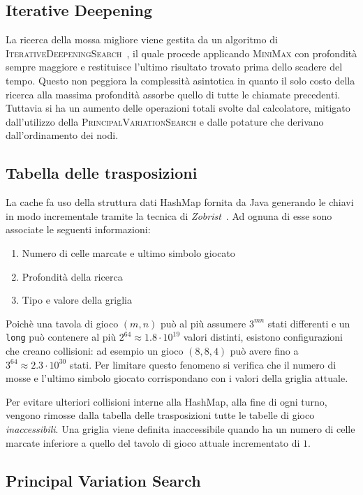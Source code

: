 \documentclass{article}
\begin{document}
\subsection{Iterative Deepening}

La ricerca della mossa migliore viene gestita da un algoritmo di
\textsc{IterativeDeepeningSearch}~\cite{id}, il quale procede applicando \textsc{MiniMax} 
con profondit\`a sempre maggiore e restituisce l'ultimo risultato trovato prima dello
scadere del tempo. \label{cost:id} Questo non peggiora la complessit\`a asintotica in quanto il
solo costo della ricerca alla massima profondit\`a assorbe quello di tutte
le chiamate precedenti. Tuttavia si ha un aumento delle operazioni totali svolte
dal calcolatore, mitigato dall'utilizzo della \textsc{PrincipalVariationSearch} 
e dalle potature che derivano dall'ordinamento dei nodi.

\subsection{Tabella delle trasposizioni}

La cache fa uso della struttura dati HashMap fornita da Java generando le chiavi 
in modo incrementale tramite la tecnica di \emph{Zobrist}~\cite{zobrist}. 
Ad ognuna di esse sono associate le seguenti informazioni:
\begin{enumerate}
  \item Numero di celle marcate e ultimo simbolo giocato
  \item Profondit\`a della ricerca
  \item Tipo e valore della griglia
\end{enumerate}
Poich\`e una tavola di gioco $(m,n)$ pu\`o al pi\`u assumere $3^{mn}$ stati differenti e
un \verb!long! pu\`o contenere al pi\`u $2^{64} \approx 1.8 \cdot 10^{19}$ valori distinti,
esistono configurazioni che creano collisioni: ad esempio un gioco $(8, 8, 4)$
pu\`o avere fino a $3^{64} \approx 2.3 \cdot 10^{30}$ stati. Per limitare questo
fenomeno si verifica che il numero di mosse e l'ultimo simbolo giocato
corrispondano con i valori della griglia attuale.

Per evitare ulteriori collisioni interne alla HashMap, alla fine di ogni turno,
vengono rimosse dalla tabella delle trasposizioni tutte le tabelle di gioco
\emph{inaccessibili}. Una griglia viene definita inaccessibile quando ha un numero di
celle marcate inferiore a quello del tavolo di gioco attuale incrementato di $1$.

\subsection{Principal Variation Search}
\end{document}
